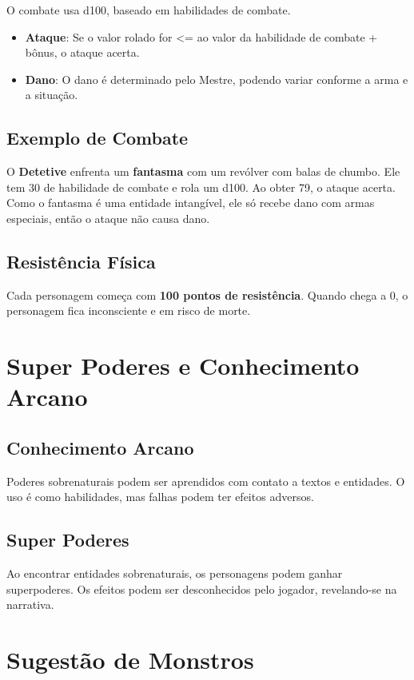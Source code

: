 \documentclass[a4paper,12pt]{book}
\begin{document}
O combate usa d100, baseado em habilidades de combate.
\begin{itemize}
    \item \textbf{Ataque}: Se o valor rolado for <= ao valor da habilidade de combate + bônus, o ataque acerta.
    \item \textbf{Dano}: O dano é determinado pelo Mestre, podendo variar conforme a arma e a situação.
\end{itemize}

\section{Exemplo de Combate}

O \textbf{Detetive} enfrenta um \textbf{fantasma} com um revólver com balas de chumbo. Ele tem 30 de habilidade de combate e rola um d100. Ao obter 79, o ataque acerta. Como o fantasma é uma entidade intangível, ele só recebe dano com armas especiais, então o ataque não causa dano.

\section{Resistência Física}

Cada personagem começa com \textbf{100 pontos de resistência}. Quando chega a 0, o personagem fica inconsciente e em risco de morte.

\chapter{Super Poderes e Conhecimento Arcano}

\section{Conhecimento Arcano}

Poderes sobrenaturais podem ser aprendidos com contato a textos e entidades. O uso é como habilidades, mas falhas podem ter efeitos adversos.

\section{Super Poderes}

Ao encontrar entidades sobrenaturais, os personagens podem ganhar superpoderes. Os efeitos podem ser desconhecidos pelo jogador, revelando-se na narrativa.

\chapter{Sugestão de Monstros}
\end{document}
